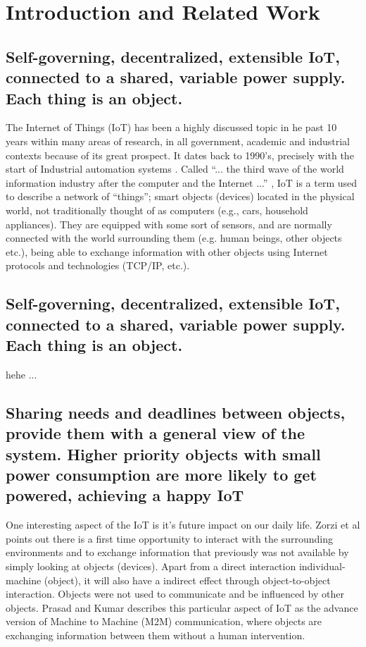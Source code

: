 \documentclass[../main/IoT.tex]{subfiles}
\begin{document}
\section{Introduction and Related Work}\label{intro}
\subsection{Self-governing, decentralized, extensible IoT, connected to a shared, variable power supply. Each thing is an object.}



The Internet of Things (IoT) has been a highly discussed topic in he past 10 years within many areas of research, in all government, academic and industrial contexts because of its great prospect. It dates back to 1990's, precisely with the start of Industrial automation systems \cite{prasad2012energy}. Called ``... the third wave of the world information industry after the computer and the Internet ...'' \cite{IoT6150221}, IoT is a term used to describe a network of ``things''; smart objects (devices) located in the physical world, not traditionally thought of as computers (e.g., cars, household appliances). They are equipped with some sort of sensors, and are normally connected with the world surrounding them (e.g. human beings, other objects etc.), being able to exchange information with other objects using Internet protocols and technologies (TCP/IP, etc.).
\subsection{Self-governing, decentralized, extensible IoT, connected to a shared, variable power supply. Each thing is an object.}

hehe ...

\subsection{Sharing needs and deadlines between objects, provide them with a general view of the system. Higher priority objects with small power consumption are more likely to get powered, achieving a happy IoT}
One interesting aspect of the IoT is it's future impact on our daily life. Zorzi et al \cite{zorzi2010today} points out there is a first time opportunity to interact with the surrounding environments and to exchange information that previously was not available by simply looking at objects (devices). Apart from a direct interaction individual-machine (object), it will also have a indirect effect through object-to-object interaction. Objects were not used to communicate and be influenced by other objects. Prasad and Kumar \cite{prasad2012energy} describes this particular aspect of IoT as the advance version of Machine to Machine (M2M) communication, where objects are exchanging information between them without a human intervention.
\end{document}
